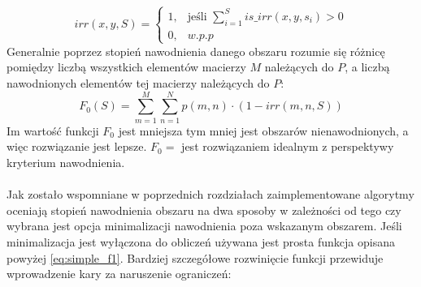 \documentclass[twoside]{iisthesis}
\begin{document}
\begin{equation}
	irr(x, y, S) = \begin{cases}
				   	1,& \text{jeśli } \sum_{i=1}^{S} is\_irr(x,y,s_{i}) > 0 \\
				   	0,& w.p.p			   	
				   \end{cases}
\end{equation}
Generalnie poprzez stopień nawodnienia danego obszaru rozumie się różnicę pomiędzy liczbą wszystkich elementów macierzy $M$ należących do $P$, a liczbą nawodnionych elementów tej macierzy należących do $P$:
\begin{equation}\label{eq:simple_f1}
	F_{0}(S) = \sum_{m=1}^{M}\sum_{n=1}^{N} p(m,n) \cdot (1 - irr(m,n,S))
\end{equation}
Im wartość funkcji $F_{0}$ jest mniejsza tym mniej jest obszarów nienawodnionych, a więc rozwiązanie jest lepsze. $F_{0} = $ jest rozwiązaniem idealnym z perspektywy kryterium nawodnienia.\\\\
Jak zostało wspomniane w poprzednich rozdziałach zaimplementowane algorytmy oceniają stopień nawodnienia obszaru na dwa sposoby w zależności od tego czy wybrana jest opcja minimalizacji nawodnienia poza wskazanym obszarem. Jeśli minimalizacja jest wyłączona do obliczeń używana jest prosta funkcja opisana powyżej \eqref{eq:simple_f1}. Bardziej szczegółowe rozwinięcie funkcji przewiduje wprowadzenie kary za naruszenie ograniczeń:
\end{document}
